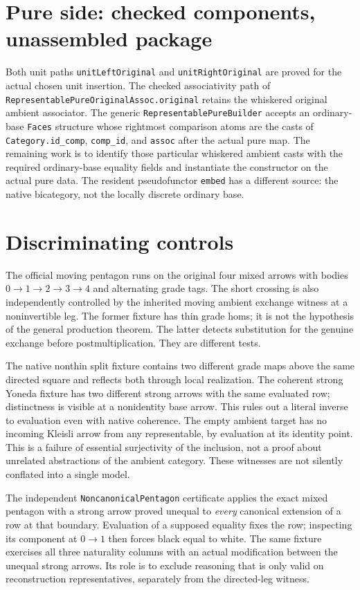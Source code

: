 \documentclass[11pt]{article}
\newcommand{\nm}[1]{\nolinkurl{#1}}
\begin{document}
\section*{Pure side: checked components, unassembled package}
Both unit paths \nm{unitLeftOriginal} and \nm{unitRightOriginal}
are proved for the actual chosen unit insertion. The checked
associativity path of \nm{RepresentablePureOriginalAssoc.original}
retains the whiskered original ambient associator. The generic
\nm{RepresentablePureBuilder} accepts an ordinary-base \nm{Faces}
structure whose rightmost comparison atoms are the casts of
\nm{Category.id_comp}, \nm{comp_id}, and \nm{assoc} after the
actual pure map. The remaining work is to identify those particular
whiskered ambient casts with the required ordinary-base equality
fields and instantiate the constructor on the actual pure data.
The resident pseudofunctor \nm{embed} has a different source: the
native bicategory, not the locally discrete ordinary base.
\section*{Discriminating controls}
The official moving pentagon runs on the original four mixed arrows
with bodies $0\to1\to2\to3\to4$ and alternating grade tags. The
short crossing is also independently controlled by the inherited moving
ambient exchange witness at a noninvertible leg. The former fixture has
thin grade homs; it is not the hypothesis of the general production
theorem. The latter detects substitution for the genuine exchange before
postmultiplication. They are different tests.

The native nonthin split fixture contains two different grade maps above
the same directed square and reflects both through local realization.
The coherent strong Yoneda fixture has two different strong arrows
with the same evaluated row; distinctness is visible at a nonidentity
base arrow. This rules out a literal inverse to evaluation even with
native coherence. The empty ambient target has no incoming Kleisli arrow
from any representable, by evaluation at its identity point. This is
a failure of essential surjectivity of the inclusion, not a proof about
unrelated abstractions of the ambient category. These witnesses are not
silently conflated into a single model.

The independent \nm{NoncanonicalPentagon} certificate applies the exact
mixed pentagon with a strong arrow proved unequal to \emph{every}
canonical extension of a row at that boundary. Evaluation of a supposed
equality fixes the row; inspecting its component at $0\to1$ then forces
black equal to white. The same fixture exercises all three naturality
columns with an actual modification between the unequal strong arrows.
Its role is to exclude reasoning that is only valid on reconstruction
representatives, separately from the directed-leg witness.
\end{document}
